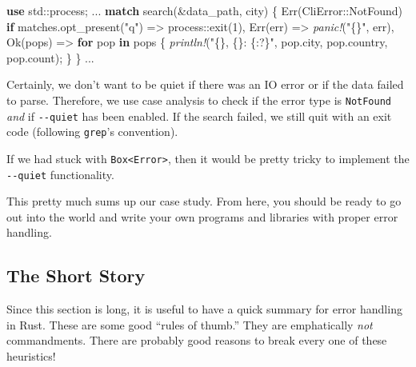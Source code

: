\documentclass[a4paper,]{book}
\renewcommand*{\hypertarget}[3][\ar]{%
  \def\ar{#2}%
  \label{#1}%
  #3}
\newenvironment{Shaded}{\begin{snugshade}}{\end{snugshade}}
\newcommand{\KeywordTok}[1]{\textcolor[rgb]{0.13,0.29,0.53}{\textbf{{#1}}}}
\newcommand{\DecValTok}[1]{\textcolor[rgb]{0.00,0.00,0.81}{{#1}}}
\newcommand{\ConstantTok}[1]{\textcolor[rgb]{0.00,0.00,0.00}{{#1}}}
\newcommand{\StringTok}[1]{\textcolor[rgb]{0.31,0.60,0.02}{{#1}}}
\newcommand{\PreprocessorTok}[1]{\textcolor[rgb]{0.56,0.35,0.01}{\textit{{#1}}}}
\newcommand{\NormalTok}[1]{{#1}}
\begin{document}
\begin{Shaded}
\begin{Highlighting}[]
\KeywordTok{use} \NormalTok{std::process;}
\NormalTok{...}
    \KeywordTok{match} \NormalTok{search(&data_path, city) \{}
        \ConstantTok{Err}\NormalTok{(CliError::NotFound) }\KeywordTok{if} \NormalTok{matches.opt_present(}\StringTok{"q"}\NormalTok{) => process::exit(}\DecValTok{1}\NormalTok{),}
        \ConstantTok{Err}\NormalTok{(err) => }\PreprocessorTok{panic!}\NormalTok{(}\StringTok{"\{\}"}\NormalTok{, err),}
        \ConstantTok{Ok}\NormalTok{(pops) => }\KeywordTok{for} \NormalTok{pop }\KeywordTok{in} \NormalTok{pops \{}
            \PreprocessorTok{println!}\NormalTok{(}\StringTok{"\{\}, \{\}: \{:?\}"}\NormalTok{, pop.city, pop.country, pop.count);}
        \NormalTok{\}}
    \NormalTok{\}}
\NormalTok{...}
\end{Highlighting}
\end{Shaded}

Certainly, we don't want to be quiet if there was an IO error or if the
data failed to parse. Therefore, we use case analysis to check if the
error type is \texttt{NotFound} \emph{and} if \texttt{-\/-quiet} has
been enabled. If the search failed, we still quit with an exit code
(following \texttt{grep}'s convention).

If we had stuck with \texttt{Box\textless{}Error\textgreater{}}, then it
would be pretty tricky to implement the \texttt{-\/-quiet}
functionality.

This pretty much sums up our case study. From here, you should be ready
to go out into the world and write your own programs and libraries with
proper error handling.

\hypertarget{the-short-story}{\subsection{The Short
Story}\label{the-short-story}}

Since this section is long, it is useful to have a quick summary for
error handling in Rust. These are some good ``rules of thumb.'' They are
emphatically \emph{not} commandments. There are probably good reasons to
break every one of these heuristics!
\end{document}
